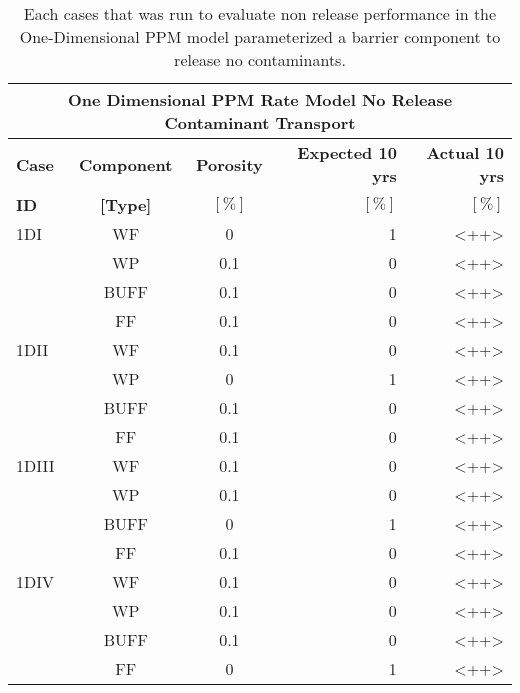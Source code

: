 
\begin{table}
\centering
\footnotesize{
\begin{tabularx}{\textwidth}{|X|c|c|r|r|}
  \multicolumn{5}{c}{\textbf{One Dimensional PPM Rate Model No Release Contaminant Transport}}\\
  \hline
  \textbf{Case}  &  \textbf{Component} &  \textbf{Porosity} & \textbf{Expected 10 yrs} & \textbf{Actual 10 yrs}\\
  \textbf{ID}    & \textbf{[Type]} &  \textbf{$[\%]$}  &  $[\%]$  & $[\%]$\\
  \hline
  1DI     &  WF    &  0   & 1 & <++> \\ 
          &  WP    &  0.1 & 0 & <++> \\ 
          &  BUFF  &  0.1 & 0 & <++> \\ 
          &  FF    &  0.1 & 0 & <++> \\ 
  \hline
  1DII    &  WF    &  0.1 & 0 & <++> \\ 
          &  WP    &  0   & 1 & <++> \\ 
          &  BUFF  &  0.1 & 0 & <++> \\ 
          &  FF    &  0.1 & 0 & <++> \\ 
  \hline
  1DIII   &  WF    &  0.1 & 0 & <++> \\ 
          &  WP    &  0.1 & 0 & <++> \\ 
          &  BUFF  &  0   & 1 & <++> \\ 
          &  FF    &  0.1 & 0 & <++> \\ 
  \hline
  1DIV    &  WF    &  0.1 & 0 & <++> \\ 
          &  WP    &  0.1 & 0 & <++> \\ 
          &  BUFF  &  0.1 & 0 & <++> \\ 
          &  FF    &  0   & 1 & <++> \\ 
  \hline
\end{tabularx}
\caption[One-Dimensional PPM Model No Release Cases]{Each cases that was run to 
evaluate non release performance in the One-Dimensional PPM model parameterized 
a barrier component to release no contaminants.}
\label{tab:1d_no_release}
}
\end{table}
